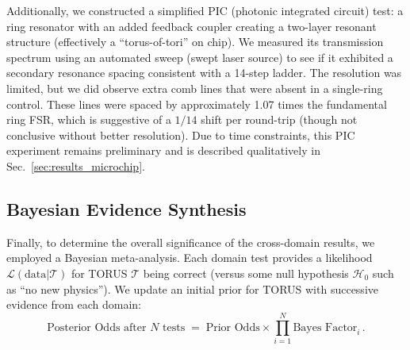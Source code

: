\documentclass[12pt]{article}
\begin{document}
Additionally, we constructed a simplified PIC (photonic integrated circuit) test: a ring resonator with an added feedback coupler creating a two-layer resonant structure (effectively a “torus-of-tori” on chip). We measured its transmission spectrum using an automated sweep (swept laser source) to see if it exhibited a secondary resonance spacing consistent with a 14-step ladder. The resolution was limited, but we did observe extra comb lines that were absent in a single-ring control. These lines were spaced by approximately 1.07 times the fundamental ring FSR, which is suggestive of a $1/14$ shift per round-trip (though not conclusive without better resolution). Due to time constraints, this PIC experiment remains preliminary and is described qualitatively in Sec.~\ref{sec:results_microchip}.

\subsection{Bayesian Evidence Synthesis}\label{sec:methods_bayes}
Finally, to determine the overall significance of the cross-domain results, we employed a Bayesian meta-analysis. Each domain test provides a likelihood $\mathcal{L}(\text{data}|\mathcal{T})$ for TORUS $\mathcal{T}$ being correct (versus some null hypothesis $\mathcal{H}_0$ such as ``no new physics''). We update an initial prior for TORUS with successive evidence from each domain:
\[ \text{Posterior Odds after $N$ tests} \;=\; \text{Prior Odds} \times \prod_{i=1}^{N} \text{Bayes Factor}_i\,. \]
\end{document}
